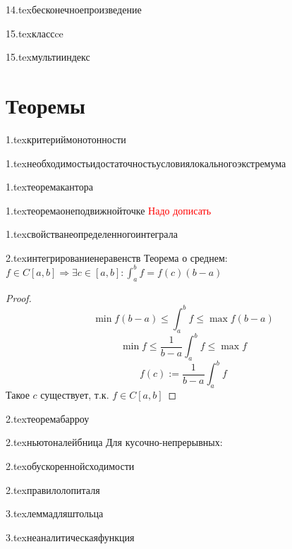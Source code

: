 {14.tex}{бесконечноепроизведение}

{15.tex}{классce}

{15.tex}{мультииндекс}

\section{Теоремы}

{1.tex}{критериймонотонности}

{1.tex}{необходимостьидостаточностьусловиялокальногоэкстремума}

{1.tex}{теоремакантора}

{1.tex}{теоремаонеподвижнойточке}
\textcolor{red}{Надо дописать}

{1.tex}{свойстванеопределенногоинтеграла}
\label{integralproperties}

{2.tex}{интегрированиенеравенств}
Теорема о среднем: $f\in C[a,b] \Rightarrow \exists c\in[a,b] : \int_a^b f = f(c)(b-a)$
\begin{proof}
    $$\min f(b-a)\le \int_a^b f \le \max f(b-a)$$
    $$\min f\le \frac{1}{b-a}\int_a^b f \le \max f$$
    $$f(c) := \frac{1}{b-a}\int_a^b f$$
    Такое $c$ существует, т.к. $f\in C[a,b]$
\end{proof}

{2.tex}{теоремабарроу}

{2.tex}{ньютоналейбница}
Для кусочно-непрерывных:\\

{2.tex}{обускореннойсходимости}

{2.tex}{правилолопиталя}

{3.tex}{леммадляштольца}

{3.tex}{неаналитическаяфункция}

